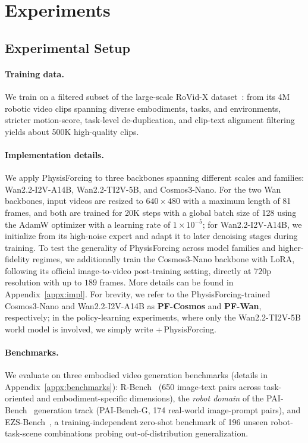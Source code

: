 \section{Experiments}

\subsection{Experimental Setup}

\paragraph{Training data.}
We train on a filtered subset of the large-scale RoVid-X dataset~\cite{deng2026rethinking}: from its
4M robotic video clips spanning diverse embodiments, tasks, and environments, stricter motion-score,
task-level de-duplication, and clip-text alignment filtering yields about 500K high-quality clips.

\paragraph{Implementation details.} We apply PhysisForcing to three backbones spanning different
scales and families: Wan2.2-I2V-A14B, Wan2.2-TI2V-5B, and Cosmos3-Nano. For the two Wan backbones,
input videos are resized to $640\times480$ with a maximum length of 81 frames, and both are trained
for 20K steps with a global batch size of 128 using the AdamW optimizer with a learning rate of
$1\times10^{-5}$; for Wan2.2-I2V-A14B, we initialize from its high-noise expert and adapt it to
later denoising stages during training. To test the generality of PhysisForcing across model
families and higher-fidelity regimes, we additionally train the Cosmos3-Nano backbone with LoRA,
following its official image-to-video post-training setting, directly at $720$p resolution with up
to $189$ frames. More details can be found in Appendix~\ref{appx:impl}. For brevity, we refer to the
PhysisForcing-trained Cosmos3-Nano and Wan2.2-I2V-A14B as \textbf{PF-Cosmos} and \textbf{PF-Wan},
respectively; in the policy-learning experiments, where only the Wan2.2-TI2V-5B world model is
involved, we simply write \mbox{+\,PhysisForcing}.

\paragraph{Benchmarks.} We evaluate on three embodied video generation benchmarks (details in
Appendix~\ref{appx:benchmarks}): R-Bench~\cite{deng2026rethinking} (650 image-text pairs across
task-oriented and embodiment-specific dimensions), the \emph{robot domain} of the
PAI-Bench~\cite{zhou2025paibench} generation track (PAI-Bench-G, 174 real-world image-prompt
pairs), and EZS-Bench~\cite{ali2025abot}, a training-independent zero-shot benchmark of 196 unseen
robot-task-scene combinations probing out-of-distribution generalization.

